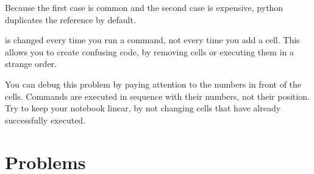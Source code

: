 \documentclass[justified, nobib]{tufte-handout}
\begin{document}
\noindent
Because the first case is common and the second case is expensive, python
duplicates the reference by default.

\smallskip
\begin{adjustwidth}{2.0em}{0pt}
  
\end{adjustwidth}

 is changed every time you run a command, not
every time you add a cell. This allows you to create confusing code, by removing
cells or executing them in a strange order.

\begin{adjustwidth}{2.5em}{0pt}

\end{adjustwidth}

\noindent
You can debug this problem by paying attention to the numbers in front of the
cells. Commands are executed in sequence with their numbers, not their
position. Try to keep your notebook linear, by not changing cells that have
already successfully executed.

\pagebreak

\section*{Problems}
\vspace{-0.5cm}
\end{document}
